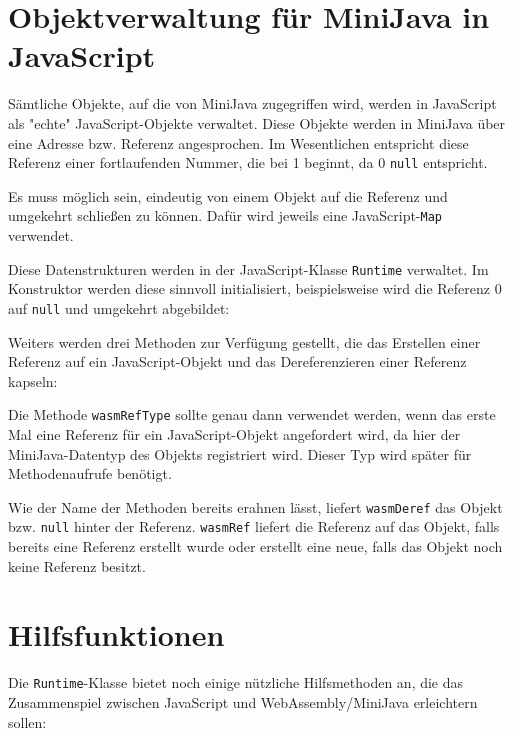 \section{Objektverwaltung für MiniJava in JavaScript}

Sämtliche Objekte, auf die von MiniJava zugegriffen wird, werden in JavaScript als "echte" JavaScript-Objekte verwaltet. Diese Objekte werden in MiniJava über eine Adresse bzw. Referenz angesprochen. Im Wesentlichen entspricht diese Referenz einer fortlaufenden Nummer, die bei 1 beginnt, da 0 \lstinline{null} entspricht.

Es muss möglich sein, eindeutig von einem Objekt auf die Referenz und umgekehrt schließen zu können. Dafür wird jeweils eine JavaScript-\lstinline{Map} verwendet.

Diese Datenstrukturen werden in der JavaScript-Klasse \lstinline{Runtime} verwaltet. Im Konstruktor werden diese sinnvoll initialisiert, beispielsweise wird die Referenz 0 auf \lstinline{null} und umgekehrt abgebildet:



Weiters werden drei Methoden zur Verfügung gestellt, die das Erstellen einer Referenz auf ein JavaScript-Objekt und das Dereferenzieren einer Referenz kapseln:



Die Methode \lstinline{wasmRefType} sollte genau dann verwendet werden, wenn das erste Mal eine Referenz für ein JavaScript-Objekt angefordert wird, da hier der MiniJava-Datentyp des Objekts registriert wird. Dieser Typ wird später für Methodenaufrufe benötigt.

Wie der Name der Methoden bereits erahnen lässt, liefert \lstinline{wasmDeref} das Objekt bzw. \lstinline{null} hinter der Referenz. \lstinline{wasmRef} liefert die Referenz auf das Objekt, falls bereits eine Referenz erstellt wurde oder erstellt eine neue, falls das Objekt noch keine Referenz besitzt.

\section{Hilfsfunktionen}

Die \lstinline{Runtime}-Klasse bietet noch einige nützliche Hilfsmethoden an, die das Zusammenspiel zwischen JavaScript und WebAssembly/MiniJava erleichtern sollen:




